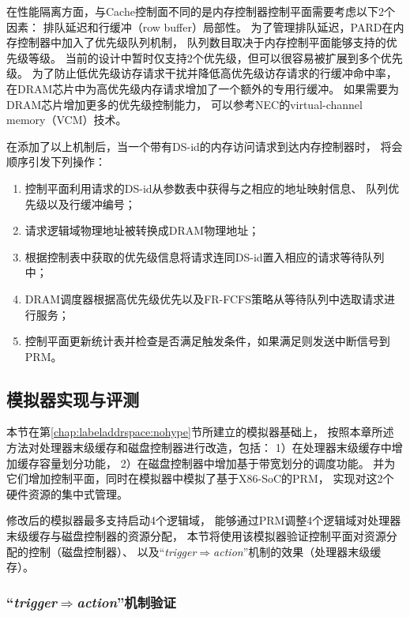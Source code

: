 在性能隔离方面，与Cache控制面不同的是内存控制器控制平面需要考虑以下2个因素：
排队延迟和行缓冲（row buffer）局部性。
为了管理排队延迟，PARD在内存控制器中加入了优先级队列机制，
队列数目取决于内存控制平面能够支持的优先级等级。
当前的设计中暂时仅支持2个优先级，但可以很容易被扩展到多个优先级。
为了防止低优先级访存请求干扰并降低高优先级访存请求的行缓冲命中率，
在DRAM芯片中为高优先级内存请求增加了一个额外的专用行缓冲。
如果需要为DRAM芯片增加更多的优先级控制能力，
可以参考NEC的virtual-channel memory（VCM）\cite{nec-vcm}技术。

在添加了以上机制后，当一个带有DS-id的内存访问请求到达内存控制器时，
将会顺序引发下列操作：

\begin{enumerate}[leftmargin=2\parindent, nolistsep, label=（\arabic*）]
  \item 控制平面利用请求的DS-id从参数表中获得与之相应的地址映射信息、
        队列优先级以及行缓冲编号；
  \item 请求逻辑域物理地址被转换成DRAM物理地址；
  \item 根据控制表中获取的优先级信息将请求连同DS-id置入相应的请求等待队列中；
  \item DRAM调度器根据高优先级优先以及FR-FCFS\cite{rixner_memory_2000}策略从等待队列中选取请求进行服务；
  \item 控制平面更新统计表并检查是否满足触发条件，如果满足则发送中断信号到PRM。
\end{enumerate}

\subsection{模拟器实现与评测}

本节在第\ref{chap:labeladdrspace:nohype}节所建立的模拟器基础上，
按照本章所述方法对处理器末级缓存和磁盘控制器进行改造，包括：
1）在处理器末级缓存中增加缓存容量划分功能，
2）在磁盘控制器中增加基于带宽划分的调度功能。
并为它们增加控制平面，同时在模拟器中模拟了基于X86-SoC的PRM，
实现对这2个硬件资源的集中式管理。

修改后的模拟器最多支持启动4个逻辑域，
能够通过PRM调整4个逻辑域对处理器末级缓存与磁盘控制器的资源分配，
本节将使用该模拟器验证控制平面对资源分配的控制（磁盘控制器）、
以及``\emph{trigger$\Rightarrow$action}''机制的效果（处理器末级缓存）。


\subsubsection{``\emph{trigger$\Rightarrow$action}''机制验证}

